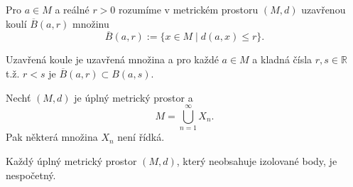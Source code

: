 \documentclass[../main.tex]{subfiles}
\begin{document}
\begin{definition}
    Pro $a \in M$ a reálné $r > 0$ rozumíme v metrickém prostoru $(M,d)$ uzavřenou koulí $\overline{B}(a,r)$ množinu
    \[ \overline{B}(a,r) := \{ x \in M \mid d(a,x) \leq r \}.\]
\end{definition}

\noindent
Uzavřená koule je uzavřená množina a pro každé $a\in M$ a kladná čísla $r,s \in \mathbb{R}$ t.ž. $r<s$ je $\overline{B}(a,r) \subset B(a,s)$.

\begin{theorem}[Baireova]
    Nechť $(M,d)$ je úplný metrický prostor a \[ M = \bigcup_{n=1}^{\infty} X_n. \]
    Pak některá množina $X_n$ není řídká.
\end{theorem}

\begin{consequence}
    Každý úplný metrický prostor $(M,d)$, který neobsahuje izolované body, je nespočetný.
\end{consequence}
\end{document}
